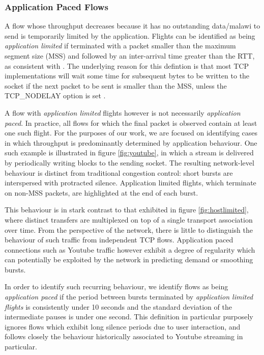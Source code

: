 \subsubsection{Application Paced Flows}
\label{sssec:app}

A flow whose throughput decreases because it has no outstanding data/malawi to send is temporarily limited by the application. 
Flights can be identified as being \emph{application limited} if terminated with a packet smaller than the maximum segment size (MSS) and followed by an inter-arrival time greater than the RTT, as consistent with \cite{Zhang:2002p85}. The underlying reason for this defintion is that most TCP implementations will wait some time for subsequent bytes to be written to the socket if the next packet to be sent is smaller than the MSS, unless the TCP\_NODELAY option is set \cite{nagle1984rfc}.

A flow with \emph{application limited} flights however is not necessarily \emph{application paced}. In practice, all flows for which the final packet is observed contain at least one such flight.
For the purposes of our work, we are focused on identifying cases in which throughput is predominantly determined by application behaviour.
One such example is illustrated in figure \ref{fig:youtube}, in which a stream is delivered by periodically writing blocks to the sending socket.
The resulting network-level behaviour is distinct from traditional congestion control: short bursts are interspersed with protracted silence.
Application limited flights, which terminate on non-MSS packets, are highlighted at the end of each burst.

This behaviour is in stark contrast to that exhibited in figure \ref{fig:hostlimited}, where distinct transfers are multiplexed on top of a single transport association over time.
From the perspective of the network, there is little to distinguish the behaviour of such traffic from independent TCP flows.
Application paced connections such as Youtube traffic however exhibit a degree of regularity which can potentially be exploited by the network in predicting demand or smoothing bursts.

In order to identify such recurring behaviour, we identify flows as being \emph{application paced} if the period between bursts terminated by \emph{application limited flights} is consistently under 10 seconds and the standard deviation of the intermediate pauses is under one second.
This definition in particular purposely ignores flows which exhibit long silence periods due to user interaction, and follows closely the behaviour historically associated to Youtube streaming in particular.

